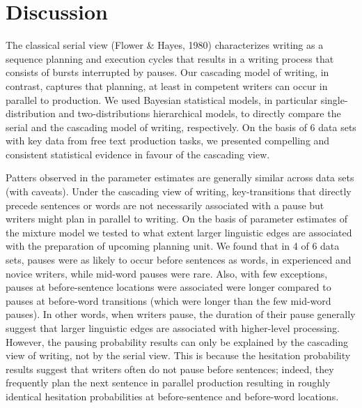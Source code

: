 \documentclass[
  english,
  man,floatsintext]{apa7}
\begin{document}
\hypertarget{discussion}{%
\section{Discussion}\label{discussion}}

The classical serial view (Flower \& Hayes, 1980) characterizes writing as a sequence planning and execution cycles that results in a writing process that consists of bursts interrupted by pauses. Our cascading model of writing, in contrast, captures that planning, at least in competent writers can occur in parallel to production. We used Bayesian statistical models, in particular single-distribution and two-distributions hierarchical models, to directly compare the serial and the cascading model of writing, respectively. On the basis of 6 data sets with key data from free text production tasks, we presented compelling and consistent statistical evidence in favour of the cascading view.

Patters observed in the parameter estimates are generally similar across data sets (with caveats). Under the cascading view of writing, key-transitions that directly precede sentences or words are not necessarily associated with a pause but writers might plan in parallel to writing. On the basis of parameter estimates of the mixture model we tested to what extent larger linguistic edges are associated with the preparation of upcoming planning unit. We found that in 4 of 6 data sets, pauses were as likely to occur before sentences as words, in experienced and novice writers, while mid-word pauses were rare. Also, with few exceptions, pauses at before-sentence locations were associated were longer compared to pauses at before-word transitions (which were longer than the few mid-word pauses). In other words, when writers pause, the duration of their pause generally suggest that larger linguistic edges are associated with higher-level processing. However, the pausing probability results can only be explained by the cascading view of writing, not by the serial view. This is because the hesitation probability results suggest that writers often do not pause before sentences; indeed, they frequently plan the next sentence in parallel production resulting in roughly identical hesitation probabilities at before-sentence and before-word locations.
\end{document}
